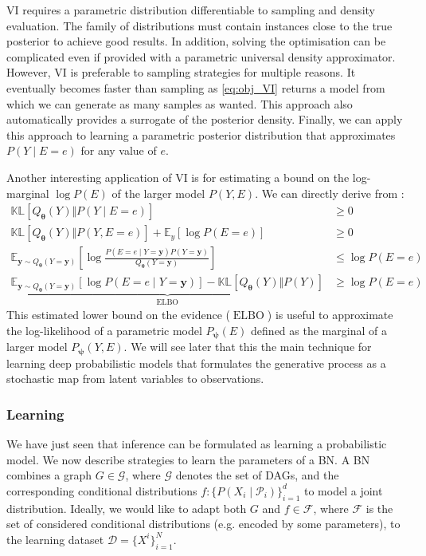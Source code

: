 VI requires a parametric distribution differentiable to sampling and density evaluation. The family of distributions must contain instances close to the true posterior to achieve good results. In addition, solving the optimisation can be complicated even if provided with a parametric universal density approximator. However, VI is preferable to sampling strategies for multiple reasons. It eventually becomes faster than sampling as \ref{eq:obj_VI} returns a model from which we can generate as many samples as wanted. This approach also automatically provides a surrogate of the posterior density. Finally, we can apply this approach to learning a parametric posterior distribution that approximates $P(Y\mid E=e)$ for any value of $e$.

Another interesting application of VI is for estimating a bound on the log-marginal $\log P(E)$ of the larger model $P(Y, E)$. We can directly derive from :
\begin{align}
  \mathbb{KL}\left[Q_{\bm{\theta}}(Y)\Vert P(Y\mid E=e)\right] &\geq 0\\
  \mathbb{KL}\left[Q_{\bm{\theta}}(Y)\Vert P(Y, E=e) \right] + \mathbb{E}_{y}\left[\log P(E=e)\right] &\geq 0\\
  \mathbb{E}_{\bm y \sim Q_{\bm{\theta}}(Y=\bm{y})}\left[ \log \frac{P(E=e\mid Y=\bm{y}) P(Y=\bm{y})}{Q_{\bm{\theta}}(Y=\bm{y})} \right] &\leq \log P(E=e)\\
  \underbrace{\mathbb{E}_{\bm y \sim Q_{\bm{\theta}}(Y=\bm{y})}\left[ \log P(E=e\mid Y=\bm{y})\right] - \mathbb{KL}\left[Q_{\bm{\theta}}(Y)\Vert P(Y)\right]}_{\operatorname{ELBO}} &\geq \log P(E=e) \label{eq:elbo}
\end{align}
This estimated lower bound on the evidence ($\operatorname{ELBO}$) is useful to approximate the log-likelihood of a parametric model $P_{\bm \psi}(E)$ defined as the marginal of a larger model $P_{\bm \psi}(Y, E)$.
We will see later that this the main technique for learning deep probabilistic models that formulates the generative process as a stochastic map from latent variables to observations.
\subsubsection{Learning}
We have just seen that inference can be formulated as learning a probabilistic model. We now describe strategies to learn the parameters of a BN.
A BN combines a graph $G \in \mathcal{G}$, where $\mathcal{G}$ denotes the set of DAGs, and the corresponding conditional distributions $f: \{P(X_i\mid \mathcal{P}_i)\}_{i=1}^d$ to model a joint distribution. Ideally, we would like to adapt both $G$ and $f \in \mathcal{F}$, where $\mathcal{F}$ is the set of considered conditional distributions (e.g. encoded by some parameters), to the learning dataset $\mathcal{D}=\{X^i\}_{i=1}^N$.

